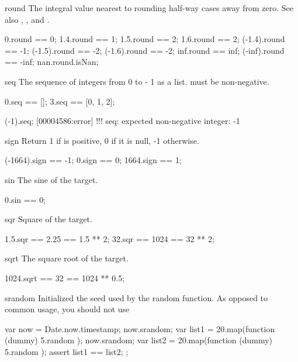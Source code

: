 \begin{urbiscriptapi}
\item[round] The integral value nearest to \this rounding half-way cases
  away from zero.  See also , , and
  .
\begin{urbiassert}
     0.round ==  0;
   1.4.round ==  1;     1.5.round ==  2;    1.6.round ==  2;
(-1.4).round == -1;  (-1.5).round == -2; (-1.6).round == -2;
   inf.round == inf; (-inf).round == -inf;
   nan.round.isNan;
\end{urbiassert}

\item[seq]%
  The sequence of integers from 0 to \this - 1 as a list.  \this must be
  non-negative.
\begin{urbiassert}
0.seq == [];  3.seq == [0, 1, 2];

(-1).seq;
[00004586:error] !!! seq: expected non-negative integer: -1
\end{urbiassert}

\item[sign]
  Return 1 if \this is positive, 0 if it is null, -1
  otherwise.
\begin{urbiassert}
(-1664).sign == -1;    0.sign ==  0;   1664.sign ==  1;
\end{urbiassert}

\item[sin]
  The sine of the target.
\begin{urbiassert}
0.sin == 0;
\end{urbiassert}

\item[sqr]
  Square of the target.
\begin{urbiassert}
1.5.sqr == 2.25 == 1.5 ** 2;
 32.sqr == 1024 ==  32 ** 2;
\end{urbiassert}

\item[sqrt]
  The square root of the target.
\begin{urbiassert}
1024.sqrt == 32 == 1024 ** 0.5;
\end{urbiassert}

\item[srandom]
  Initialized the seed used by the random function.  As opposed to common
  usage, you should not use
\begin{urbiunchecked}
{
  var now = Date.now.timestamp;
  now.srandom;
  var list1 = 20.map(function (dummy) { 5.random });
  now.srandom;
  var list2 = 20.map(function (dummy) { 5.random });
  assert
  {
    list1 == list2;
  }
};
\end{urbiunchecked}


\end{urbiscriptapi}

